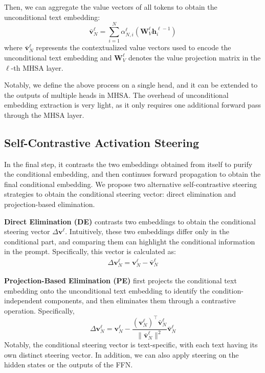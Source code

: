 \documentclass[11pt]{article}
\newcommand{\vv}{\mathbf{v}}
\newcommand{\paren}[1]{\left(#1\right)}
\begin{document}
Then, we can aggregate the value vectors of all tokens to obtain the unconditional text embedding: 
\begin{equation}
    \bar{\vv}^{\ell}_N = \sum_{i=1}^{N} \alpha^{\ell}_{N,i} \paren{\mathbf{W}^{\ell}_V \mathbf{h}^{\ell-1}_i}
\end{equation}
where $\bar{\vv}^{\ell}_N$ represents the contextualized value vectors used to encode the unconditional text embedding and $\mathbf{W}^{\ell}_V$ denotes the value projection matrix in the $\ell$-th MHSA layer.

Notably, we define the above process on a single head, and it can be extended to the outputs of multiple heads in MHSA.
The overhead of unconditional embedding extraction is very light, as it only requires one additional forward pass through the MHSA layer.


\subsection{Self-Contrastive Activation Steering}
In the final step, it contrasts the two embeddings obtained from itself to purify the conditional embedding, and then continues forward propagation to obtain the final conditional embedding.
We propose two alternative self-contrastive steering strategies to obtain the conditional steering vector: direct elimination and projection-based elimination.


\textbf{Direct Elimination (DE)} contrasts two embeddings to obtain the conditional steering vector $\Delta\mathbf{v}^{\ell}$.
Intuitively, these two embeddings differ only in the conditional part, and comparing them can highlight the conditional information in the prompt.
Specifically, this vector is calculated as:
\begin{align}
    \Delta\vv^{\ell}_N = \vv^{\ell}_N - \bar{\vv}^{\ell}_N
    \label{eq:semantic_vector}
\end{align}

\textbf{Projection-Based Elimination (PE)} first projects the conditional text embedding onto the unconditional text embedding to identify the condition-independent components, and then eliminates them through a contrastive operation.
Specifically,
\begin{equation}
\Delta\vv^{\ell}_N = \vv^{\ell}_N - \frac{(\vv^{\ell}_N)^{\!\top} \bar{\vv}^{\ell}_N}{\|\bar{\vv}^{\ell}_N\|^2} \bar{\vv}^{\ell}_N
\end{equation}
Notably, the conditional steering vector is text-specific, with each text having its own distinct steering vector.
In addition, we can also apply steering on the hidden states or the outputs of the FFN.
\end{document}
